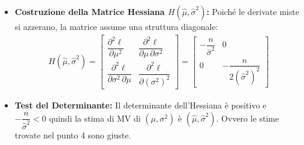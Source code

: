 \documentclass{article}  %
\theoremstyle{definition}
\begin{document}
\begin{esempio}
\begin{enumerate}
\begin{itemize}
			      \item \textbf{Costruzione della Matrice Hessiana $H(\hat{\mu}, \hat{\sigma}^2)$:}
			            Poiché le derivate miste si azzerano, la matrice assume una struttura diagonale:
			            \begin{align*}
				            H(\hat{\mu}, \hat{\sigma}^2) =
				            \begin{bmatrix}
					            \left. \dfrac{\partial^2 \ell}{\partial \mu^2} \right.                    & \left. \dfrac{\partial^2 \ell}{\partial \mu \, \partial \sigma^2} \right. \\[15pt]
					            \left. \dfrac{\partial^2 \ell}{\partial \sigma^2 \, \partial \mu} \right. & \left. \dfrac{\partial^2 \ell}{\partial (\sigma^2)^2} \right.
				            \end{bmatrix}
				            =
				            \begin{bmatrix}
					            -\dfrac{n}{\hat{\sigma}^2} & 0                               \\[15pt]
					            0                          & -\dfrac{n}{2(\hat{\sigma}^2)^2}
				            \end{bmatrix}
			            \end{align*}

			      \item \textbf{Test del Determinante:}
			            Il determinante dell'Hessiana è positivo e \\ $-\dfrac{n}{\hat{\sigma}^2} < 0$ quindi la stima di MV di $(\mu, \sigma^2)$ è $(\hat{\mu}, \hat{\sigma}^2)$.
			            Ovvero le stime trovate nel punto 4 sono giuste.
		      \end{itemize}
	\end{enumerate}
\end{esempio}
\end{document}
